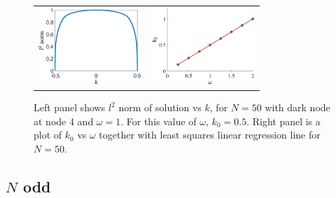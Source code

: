 \documentclass[reprint, amsmath,amssymb,aps]{revtex4-2}
\begin{document}
\begin{figure}
\begin{center}
\begin{tabular}{cc}
\includegraphics[width=3.9cm]{evenbif50.eps} &
\includegraphics[width=3.9cm]{k0vsomega.eps}
\end{tabular}
\end{center}
\caption{Left panel shows $l^2$ norm of solution vs $k$, for $N = 50$ with dark node at node 4 and $\omega = 1$. For this value of $\omega$, $k_0 = 0.5$. Right panel is a plot of $k_0$ vs $\omega$ together with least squares linear regression line for $N = 50$.}
\label{fig:evenbif}
\end{figure}

\subsection{\texorpdfstring{$N$}{N} odd}\label{sec:Nodd}
\end{document}
